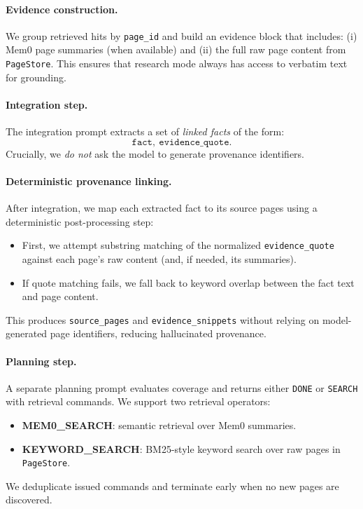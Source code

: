 \documentclass{article}
\theoremstyle{plain}
\theoremstyle{definition}
\theoremstyle{remark}
\begin{document}
\paragraph{Evidence construction.}
We group retrieved hits by \texttt{page\_id} and build an evidence block that includes:
(i) Mem0 page summaries (when available) and
(ii) the full raw page content from \texttt{PageStore}.
This ensures that research mode always has access to verbatim text for grounding.

\paragraph{Integration step.}
The integration prompt extracts a set of \emph{linked facts} of the form:
\[
\texttt{fact},~\texttt{evidence\_quote}.
\]
Crucially, we \emph{do not} ask the model to generate provenance identifiers.

\paragraph{Deterministic provenance linking.}
After integration, we map each extracted fact to its source pages using a deterministic post-processing step:
\begin{itemize}
    \item First, we attempt substring matching of the normalized \texttt{evidence\_quote} against each page's raw content (and, if needed, its summaries).
    \item If quote matching fails, we fall back to keyword overlap between the fact text and page content.
\end{itemize}
This produces \texttt{source\_pages} and \texttt{evidence\_snippets} without relying on model-generated page identifiers, reducing hallucinated provenance.

\paragraph{Planning step.}
A separate planning prompt evaluates coverage and returns either \texttt{DONE} or \texttt{SEARCH} with retrieval commands. We support two retrieval operators:
\begin{itemize}
    \item \textbf{MEM0\_SEARCH}: semantic retrieval over Mem0 summaries.
    \item \textbf{KEYWORD\_SEARCH}: BM25-style keyword search over raw pages in \texttt{PageStore}.
\end{itemize}
We deduplicate issued commands and terminate early when no new pages are discovered.
\end{document}
